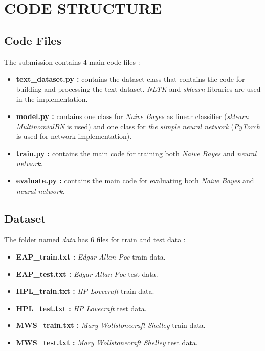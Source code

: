 \documentclass[letterpaper, 10 pt, conference]{ieeeconf}  %
\begin{document}

\section{CODE STRUCTURE}
\subsection{Code Files}
The submission contains $4$ main code files :
\begin{itemize}
    \item \textbf{text\_dataset.py :} contains the dataset class that contains the code for building and processing the text dataset. \emph{NLTK} and \emph{sklearn} libraries are used in the implementation.
    \item \textbf{model.py :} contains one class for \emph{Naive Bayes} as linear classifier (\emph{sklearn MultinomialBN} is used) and one class for \emph{the simple neural network} (\emph{PyTorch} is used for network implementation).
    \item \textbf{train.py :} contains the main code for training both \emph{Naive Bayes} and \emph{neural network}.
    \item \textbf{evaluate.py :} contains the main code for evaluating both \emph{Naive Bayes} and \emph{neural network}.
\end{itemize}

\subsection{Dataset}
The folder named \emph{data} has $6$ files for train and test data :
\begin{itemize}
    \item \textbf{EAP\_train.txt :} \emph{Edgar Allan Poe} train data.
    \item \textbf{EAP\_test.txt :} \emph{Edgar Allan Poe} test data.
    \item \textbf{HPL\_train.txt :} \emph{HP Lovecraft} train data.
    \item \textbf{HPL\_test.txt :} \emph{HP Lovecraft} test data.
    \item \textbf{MWS\_train.txt :} \emph{Mary Wollstonecraft Shelley} train data.
    \item \textbf{MWS\_test.txt :} \emph{Mary Wollstonecraft Shelley} test data.
\end{itemize}
\end{document}
